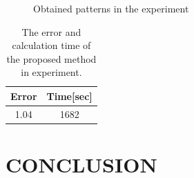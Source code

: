 \documentclass[E]{scitrans}
\begin{document}
\begin{figure}[!h]
	\centering
	\hfil
	
	\caption{Obtained patterns in the experiment}
	\label{fig:ObtainedSurfaceNDS2_Pat}
\end{figure}

\begin{table}[!h]
	\centering
	\caption{The error and calculation time of the proposed method in experiment.}
	\label{tbl:error and calc2}
	\begin{tabular}{|c|c|} \hline
		Error & Time[sec] \\ \hline
		1.04& 1682 \\ \hline
	\end{tabular}
\end{table}

\section*{CONCLUSION}
\end{document}
